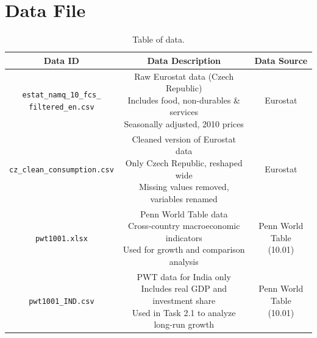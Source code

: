 \documentclass[12pt,a4paper,notitlepage]{article}
\numberwithin{equation}{section}
\begin{document}
\section*{Data File}
\begin{table}[h]
	\begin{center}
		\begin{tabular}{|c|c|c|}
			\hline
			\textbf{Data ID} & \textbf{Data Description} & \textbf{Data Source} \\ \hline
			
			\makecell{\texttt{estat\_namq\_10\_fcs\_} \\
			\texttt{filtered\_en.csv}} & 
			\makecell{Raw Eurostat data (Czech Republic) \\
			Includes food, non-durables \& services \\
			Seasonally adjusted, 2010 prices} & 
			Eurostat \\ \hline
			
			\texttt{cz\_clean\_consumption.csv} & 
			\makecell{Cleaned version of Eurostat data \\
			Only Czech Republic, reshaped wide \\
			Missing values removed, variables renamed} & 
			Eurostat \\ \hline
			
			\texttt{pwt1001.xlsx} & 
            \makecell{Penn World Table data \\
            Cross-country macroeconomic indicators \\ Used for growth and comparison analysis} & 
            \makecell{Penn World Table \\ (10.01)} \\ \hline

			\texttt{pwt1001\_IND.csv} & 
            \makecell{PWT data for India only \\
             Includes real GDP and investment share \\
            Used in Task 2.1 to analyze long-run growth} & 
            \makecell{Penn World Table \\ (10.01)} \\ \hline

			
			
			
		\end{tabular}
		\caption{Table of data.}
	\end{center}
\end{table}



\newpage
\end{document}

